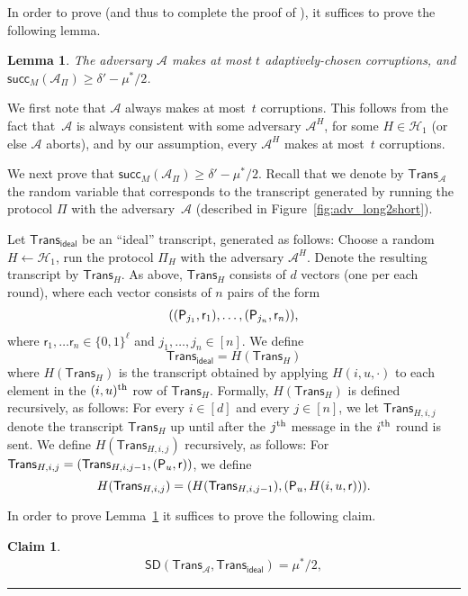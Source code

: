 \documentclass[11pt]{article}
\theoremstyle{plain}
\newtheorem{lemma}[theorem]{Lemma}
\newtheorem{claim}[theorem]{Claim}
\theoremstyle{definition}
\numberwithin{equation}{section}
\newcommand{\qedsymb}{\hfill{\rule{2mm}{2mm}}}
\renewenvironment{proof}{\begin{trivlist} \item[\hspace{\labelsep}{\bf
\noindent Proof.\/}] }{\qedsymb\end{trivlist}}
\numberwithin{equation}{section} \newcommand{\aka} {also known as\ }
\newcommand{\Hc}{\mathcal H}
\newcommand{\B}{\{ 0,1 \}}
\newcommand{\1}{\mathbf{1}}
\newcommand{\Adv}{\mathcal A}
\newcommand{\ith}[1]{{#1}\textsuperscript{th}}
\newcommand{\SD}{\mathsf{SD}}
\newcommand{\sh}{{\mathsf{r}}}
\newcommand{\success}{{\mathsf{succ}}}
\newcommand{\valb}[3]{{\success_{#1}(#3_{#2})}}
\newcommand{\real}{\Adv}
\newcommand{\ideal}{\mathsf{ideal}}
\newcommand{\trans}{{\mathsf{Trans}}}
\theoremstyle{remark}
\begin{document}
In order to prove  (and thus to complete the proof of
), it suffices to prove the following lemma.
\begin{lemma}\label{lemma:reformulated}
  The adversary $\Adv$ makes at most $t$ adaptively-chosen corruptions, and $\valb{M}{\Pi}{\Adv}\geq\delta'-\mu^*/2$.
\end{lemma}
\begin{proof}
We first note that $\Adv$ always makes at most~$t$ corruptions. This follows from the fact that~$\Adv$ is always consistent with some adversary $\Adv^H$, for some $H\in\Hc_1$ (or else $\Adv$ aborts), and by our assumption, every $\Adv^H$ makes at most~$t$ corruptions.

We next prove that
$\valb{M}{\Pi}{\Adv}\geq\delta'-\mu^*/2$.
Recall that we denote by $\trans_\Adv$ the random variable that corresponds to the
  transcript generated by running the protocol $\Pi$ with the adversary~$\Adv$
  (described in Figure~\ref{fig:adv_long2short}).

  Let $\trans_{\ideal}$ be an ``ideal'' transcript, generated as follows: Choose
  a random $H\leftarrow\Hc_1$, run the protocol $\Pi_H$ with the adversary
  $\Adv^H$.  Denote the resulting transcript by $\trans_H$.  As above,
  $\trans_H$ consists of $d$ vectors (one per each round), where each vector
consists of $n$ pairs of the form
\begin{align*}
  ((\party{j_1},\sh_1),\ldots,(\party{j_{n}},\sh_n)),
\end{align*}
where $\sh_1,\ldots\sh_n\in\B^\ell$ and $j_1,\dots,j_n\in[n]$.  We define
  $$
  \trans_\ideal=H(\trans_H)
  $$
 where $H(\trans_H)$ is the transcript obtained by applying $H(i,u,\cdot)$ to each element in the $\ith{(i,u)}$ row of $\trans_H$. Formally, $H(\trans_H)$  is defined recursively, as follows: For every $i\in[d]$ and every $j\in[n]$, we let $\trans_{H,i,j}$ denote the transcript $\trans_H$ up until after the $\ith{j}$ message in the $\ith{i}$ round is sent.
 We define $H(\trans_{H,i,j})$ recursively, as follows:  For $\trans_{H,i,j}=(\trans_{H,i,j-1},(\party{u},\sh))$, we define
 $$
 H(\trans_{H,i,j})=(H(\trans_{H,i,j-1}),(\party{u},H(i,u,\sh))).
 $$


 In order to prove Lemma~\ref{lemma:reformulated} it suffices to prove the
 following claim.

 \begin{claim}\label{claim:SD}
   \begin{align*}
     \SD(\trans_{\real},\trans_{\ideal}) =\mu^*/2,
   \end{align*}
 \end{claim}





\end{proof}
\end{document}
